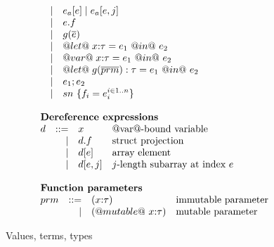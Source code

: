 \documentclass[nocopyrightspace,preprint,onecolumn,10pt]{sigplanconf}  %
\theoremstyle{remark}
\theoremstyle{definition}
\theoremstyle{plain}
\def\ol#1{\overline{#1}}
\newcommand{\es}{\ol{e}}
\begin{document}
\begin{figure}
\[\begin{array}{l}
\begin{array}{rrll}
       & \mid & e_a[e] \mid e_a[e,j] \\ 
       & \mid & \proj{e}{f} \\ 
       & \mid & g(\es) \\ 
       & \mid & @let@\;x{:}\tau = e_1~@in@~e_2 \\ 
       & \mid & @var@\;x{:}\tau = e_1~@in@~e_2 \\ 
       & \mid & @let@\;g(\ol{prm}) : \tau = e_1~@in@~e_2 \\
       & \mid & e_1;e_2 \\ 
       & \mid & sn~\{ f_i = e_i^{i \in 1..n} \} 
  \end{array} \\ \\ 
  \begin{array}{rrll} 
   \multicolumn{4}{l}{\text{\bf Dereference expressions}} \\
     d &  ::= & x      & \text{@var@-bound variable} \\ 
       & \mid & \proj{d}{f}   & \text{struct projection} \\ 
       & \mid & d[e]   & \text{array element} \\ 
       & \mid & d[e,j] & \text{$j$-length subarray at index $e$}
  \end{array} \\ \\ 

  \begin{array}{rrll} 
   \multicolumn{4}{l}{\text{\bf Function parameters}} \\ 
    prm & ::=  & (x{:}\tau)          & \text{immutable parameter} \\ 
        & \mid & (@mutable@~x{:}\tau) & \text{mutable parameter}
  \end{array}
\end{array}\]
\caption{Values, terms, types}
  \label{fig:syntax}
\end{figure}
\end{document}
